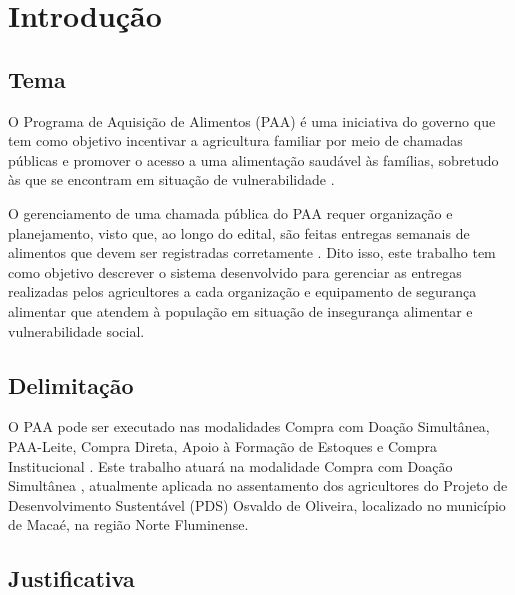 \chapter{Introdução}

\section{Tema}

O Programa de Aquisição de Alimentos (PAA) é uma iniciativa do governo que tem como objetivo incentivar a agricultura familiar por meio de chamadas públicas e promover o acesso a uma alimentação saudável às famílias, sobretudo às que se encontram em situação de vulnerabilidade \cite{cirino2016sistema,cirino2017prazo}.

O gerenciamento de uma chamada pública do PAA requer organização e planejamento, visto que, ao longo do edital, são feitas entregas semanais de alimentos que devem ser registradas corretamente \cite{cirino2016sistema,resende2013presconpaa}. Dito isso, este trabalho tem como objetivo descrever o sistema desenvolvido para gerenciar as entregas realizadas pelos agricultores a cada organização e equipamento de segurança alimentar que atendem à população em situação de insegurança alimentar e vulnerabilidade social.


\section{Delimitação}

O PAA pode ser executado nas modalidades Compra com Doação Simultânea, PAA-Leite, Compra Direta, Apoio à Formação de Estoques e Compra Institucional \cite{mds2026modalidades}. Este trabalho atuará na modalidade Compra com Doação Simultânea \cite{mds2025adesaoPAA}, atualmente aplicada no assentamento dos agricultores do Projeto de Desenvolvimento Sustentável (PDS) Osvaldo de Oliveira, localizado no município de Macaé, na região Norte Fluminense.

\section{Justificativa}

